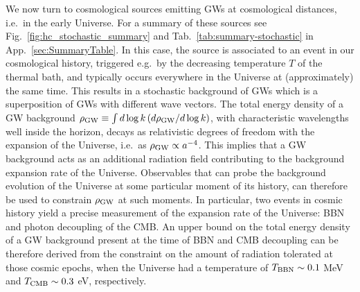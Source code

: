 \documentclass[11pt,a4paper]{article}
\begin{document}
We now turn to cosmological sources emitting GWs at cosmological distances, i.e.\ in the early Universe. For a summary of these sources see Fig.~\ref{fig:hc_stochastic_summary} and Tab.~\ref{tab:summary-stochastic} in App.~\ref{sec:SummaryTable}. In this case, the source is associated to an event in our cosmological history, triggered e.g.\ by the decreasing temperature $T$ of the thermal bath, and typically occurs everywhere in the Universe at (approximately) the same time. This results in a stochastic background of GWs which is a superposition of GWs with different wave vectors. The total energy density of a GW background $\rho_{\rm GW} \equiv \int d\log k \left(d\rho_{\rm GW} / d\log k\right)$, with characteristic wavelengths well inside the horizon, decays as relativistic degrees of freedom with the expansion of the Universe, i.e.~as $\rho_{\rm GW}\propto a^{-4}$. This implies that a GW background acts as an additional radiation field contributing to the background expansion rate of the Universe. Observables that can probe the background evolution of the Universe at some particular moment of its history, can therefore be used to constrain $\rho_{\rm GW}$ at such moments. In particular, two events in cosmic history yield a precise measurement of the expansion rate of the Universe: BBN and photon decoupling of the CMB. An upper bound on the total energy density of a GW background present at the time of BBN and CMB decoupling can be therefore derived from the constraint on the amount of radiation tolerated at those cosmic epochs, when the Universe had a temperature of $T_{\rm BBN} \sim 0.1$ MeV and $T_{\rm CMB} \sim 0.3$ eV, respectively.
\end{document}
